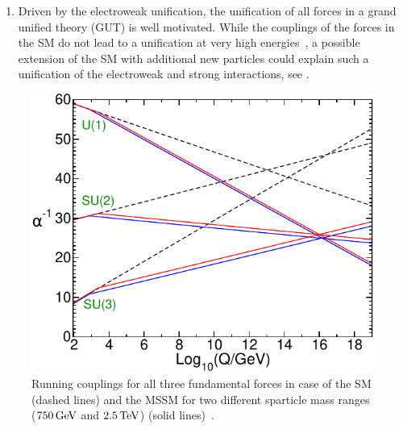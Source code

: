\begin{enumerate}
 \item Driven by the electroweak unification, the unification of all forces in a grand unified theory (GUT) is well motivated. While the couplings of the forces in the SM do not lead to a unification at very high energies~\cite{PDG}, a possible extension of the SM with additional new particles could explain such a unification of the electroweak and strong interactions, see .
\end{enumerate}
\begin{figure}
 \centering
 \includegraphics[width=\pairwidth]{figures/general/couplings}
 \caption{Running couplings for all three fundamental forces in case of the SM (dashed lines) and the MSSM for two different sparticle mass ranges ($750\,\text{Ge\hspace{-.08em}V}$ and $2.5\,\text{Te\hspace{-.08em}V}$) (solid lines)~\cite{SUSYPrimer}.}
 \label{fig:couplings}
\end{figure}



